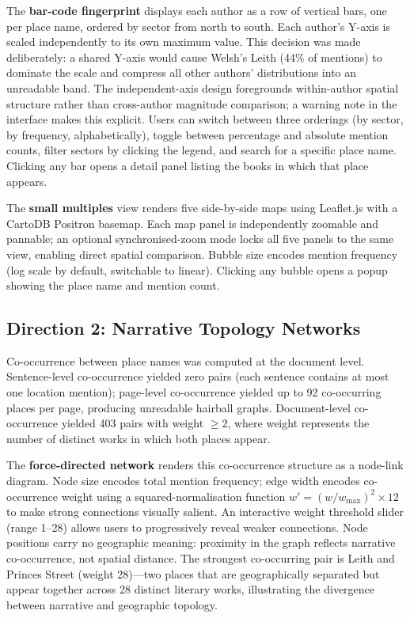 \documentclass[11pt,a4paper]{article}
\begin{document}
The \textbf{bar-code fingerprint} displays each author as a row of vertical bars, one per place name, ordered by sector from north to south. Each author's Y-axis is scaled independently to its own maximum value. This decision was made deliberately: a shared Y-axis would cause Welsh's Leith (44\% of mentions) to dominate the scale and compress all other authors' distributions into an unreadable band. The independent-axis design foregrounds within-author spatial structure rather than cross-author magnitude comparison; a warning note in the interface makes this explicit. Users can switch between three orderings (by sector, by frequency, alphabetically), toggle between percentage and absolute mention counts, filter sectors by clicking the legend, and search for a specific place name. Clicking any bar opens a detail panel listing the books in which that place appears.

The \textbf{small multiples} view renders five side-by-side maps using Leaflet.js with a CartoDB Positron basemap. Each map panel is independently zoomable and pannable; an optional synchronised-zoom mode locks all five panels to the same view, enabling direct spatial comparison. Bubble size encodes mention frequency (log scale by default, switchable to linear). Clicking any bubble opens a popup showing the place name and mention count.

\subsection*{Direction 2: Narrative Topology Networks}

Co-occurrence between place names was computed at the document level. Sentence-level co-occurrence yielded zero pairs (each sentence contains at most one location mention); page-level co-occurrence yielded up to 92 co-occurring places per page, producing unreadable hairball graphs. Document-level co-occurrence yielded 403 pairs with weight $\geq 2$, where weight represents the number of distinct works in which both places appear.

The \textbf{force-directed network} renders this co-occurrence structure as a node-link diagram. Node size encodes total mention frequency; edge width encodes co-occurrence weight using a squared-normalisation function $w' = (w / w_{\max})^2 \times 12$ to make strong connections visually salient. An interactive weight threshold slider (range 1--28) allows users to progressively reveal weaker connections. Node positions carry no geographic meaning: proximity in the graph reflects narrative co-occurrence, not spatial distance. The strongest co-occurring pair is Leith and Princes Street (weight 28)---two places that are geographically separated but appear together across 28 distinct literary works, illustrating the divergence between narrative and geographic topology.
\end{document}
